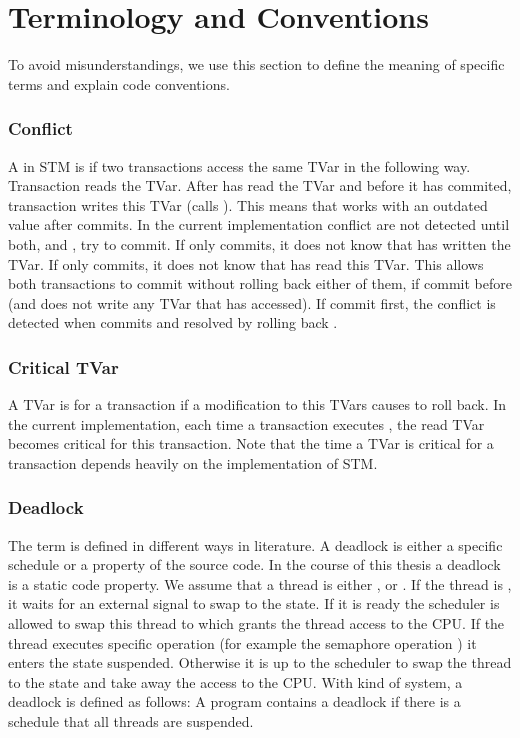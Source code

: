 \section{Terminology and Conventions}
\label{definitions}
To avoid misunderstandings, we use this section to define the meaning of specific terms and explain code conventions.

\subsubsection{Conflict}
A  in STM is if two transactions access the same TVar in the following way. Transaction  reads 
the TVar. After  has read the TVar and before it has commited, transaction  writes this TVar (calls ). 
This means that  works with an outdated value after  commits. In the current implementation
conflict are not detected until both,  and , try to commit. If only  commits, it does not 
know that  has written the TVar. If only  commits, it does not know that  has read this TVar.
This allows both transactions to commit without rolling back either of them, if  commit before  (and 
does not write any TVar that  has accessed). If  commit first, the conflict is detected when  commits
and resolved by rolling back .

\subsubsection{Critical TVar}
A TVar is  for a transaction  if a modification to this TVars causes  to roll back. In the current
implementation, each time a transaction executes , the read TVar becomes critical for this transaction. Note that the
time a TVar is critical for a transaction depends heavily on the implementation of STM. 

\subsubsection{Deadlock}
The term  is defined in different ways in literature. A deadlock is either a specific
schedule or a property of the source code. In the course of this thesis a deadlock
is a static code property. We assume that a thread is either ,  or .
If the thread is , it waits for an external signal to swap to the  state. If it
is ready the scheduler is allowed to swap this thread to  which grants the thread access to
the CPU. If the thread executes specific operation (for example the semaphore operation ) it enters 
the state suspended. Otherwise it is up to the scheduler to swap the thread to the  state and
take away the access to the CPU. With kind of system, a deadlock is defined as follows:
A program contains a deadlock if there is a schedule that all threads are suspended.

